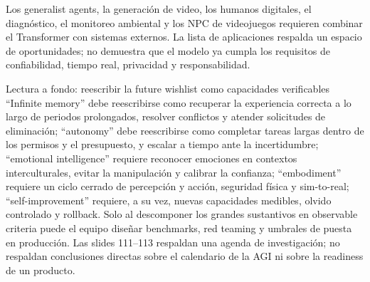 Los generalist agents, la generación de video, los humanos digitales, el diagnóstico, el monitoreo ambiental y los NPC de videojuegos requieren combinar el Transformer con sistemas externos. La lista de aplicaciones respalda un espacio de oportunidades; no demuestra que el modelo ya cumpla los requisitos de confiabilidad, tiempo real, privacidad y responsabilidad.







\begin{knowledgebox}{Lectura a fondo: reescribir la future wishlist como capacidades verificables}
``Infinite memory'' debe reescribirse como recuperar la experiencia correcta a lo largo de periodos prolongados, resolver conflictos y atender solicitudes de eliminación; ``autonomy'' debe reescribirse como completar tareas largas dentro de los permisos y el presupuesto, y escalar a tiempo ante la incertidumbre; ``emotional intelligence'' requiere reconocer emociones en contextos interculturales, evitar la manipulación y calibrar la confianza; ``embodiment'' requiere un ciclo cerrado de percepción y acción, seguridad física y sim-to-real; ``self-improvement'' requiere, a su vez, nuevas capacidades medibles, olvido controlado y rollback. Solo al descomponer los grandes sustantivos en observable criteria puede el equipo diseñar benchmarks, red teaming y umbrales de puesta en producción. Las slides 111--113 respaldan una agenda de investigación; no respaldan conclusiones directas sobre el calendario de la AGI ni sobre la readiness de un producto.
\end{knowledgebox}


